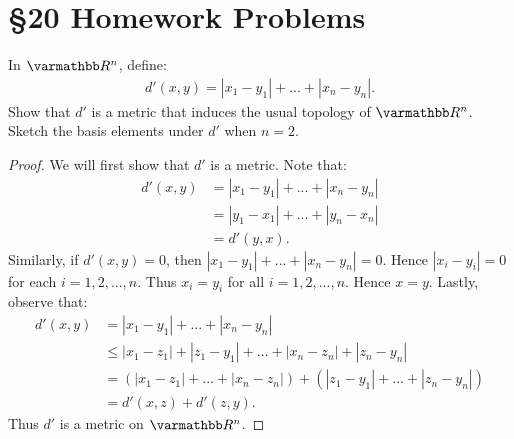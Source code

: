 \documentclass[12pt,twoside,openany]{memoir}
\begin{document}
\section*{\S 20 Homework Problems}
\begin{exercise}[manual-num={1(a)}]
In $\bfR^n$, define:
    \begin{equation*}
    \begin{split}
        d'(x,y) = |x_1 - y_1| + ... + |x_n - y_n|.
    \end{split}
    \end{equation*}
Show that $d'$ is a metric that induces the usual topology of $\bfR^n$. Sketch the basis elements under $d'$ when $n = 2$.
\end{exercise}
    {\color{blue} \begin{proof}
        We will first show that $d'$ is a metric. Note that:
            \begin{equation*}
            \begin{split}
                d'(x,y) 
                & = |x_1 - y_1| + ... + |x_n - y_n| \\
                & = |y_1 - x_1| + ... + |y_n - x_n| \\
                & = d'(y,x).
            \end{split}
            \end{equation*}
        Similarly, if $d'(x,y) = 0$, then $|x_1 - y_1|+...+|x_n - y_n| = 0$. Hence $|x_i - y_i| = 0$ for each $i =1,2,...,n$. Thus $x_i = y_i$ for all $i=1,2,...,n$. Hence $x = y$. Lastly, observe that:
            \begin{equation*}
            \begin{split}
                d'(x,y) 
                & = |x_1 - y_1| + ... + |x_n - y_n| \\
                & \leq |x_1 - z_1| + |z_1 - y_1| + ... + |x_n - z_n| + |z_n - y_n| \\
                & = \left( |x_1 - z_1| + ... + |x_n - z_n| \right) + \left( |z_1 - y_1| + ... + |z_n - y_n| \right) \\
                & = d'(x,z) + d'(z,y).
            \end{split}
            \end{equation*}
        Thus $d'$ is a metric on $\bfR^n$.


\end{proof}}
\end{document}
